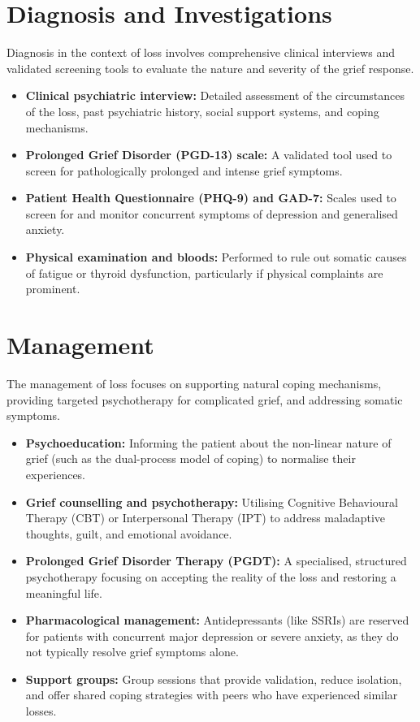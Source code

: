 \section*{Diagnosis and Investigations}
Diagnosis in the context of loss involves comprehensive clinical interviews and validated screening tools to evaluate the nature and severity of the grief response.
\begin{itemize}
    \item \textbf{Clinical psychiatric interview:} Detailed assessment of the circumstances of the loss, past psychiatric history, social support systems, and coping mechanisms.
    \item \textbf{Prolonged Grief Disorder (PGD-13) scale:} A validated tool used to screen for pathologically prolonged and intense grief symptoms.
    \item \textbf{Patient Health Questionnaire (PHQ-9) and GAD-7:} Scales used to screen for and monitor concurrent symptoms of depression and generalised anxiety.
    \item \textbf{Physical examination and bloods:} Performed to rule out somatic causes of fatigue or thyroid dysfunction, particularly if physical complaints are prominent.
\end{itemize}

\section*{Management}
The management of loss focuses on supporting natural coping mechanisms, providing targeted psychotherapy for complicated grief, and addressing somatic symptoms.
\begin{itemize}
    \item \textbf{Psychoeducation:} Informing the patient about the non-linear nature of grief (such as the dual-process model of coping) to normalise their experiences.
    \item \textbf{Grief counselling and psychotherapy:} Utilising Cognitive Behavioural Therapy (CBT) or Interpersonal Therapy (IPT) to address maladaptive thoughts, guilt, and emotional avoidance.
    \item \textbf{Prolonged Grief Disorder Therapy (PGDT):} A specialised, structured psychotherapy focusing on accepting the reality of the loss and restoring a meaningful life.
    \item \textbf{Pharmacological management:} Antidepressants (like SSRIs) are reserved for patients with concurrent major depression or severe anxiety, as they do not typically resolve grief symptoms alone.
    \item \textbf{Support groups:} Group sessions that provide validation, reduce isolation, and offer shared coping strategies with peers who have experienced similar losses.
\end{itemize}

